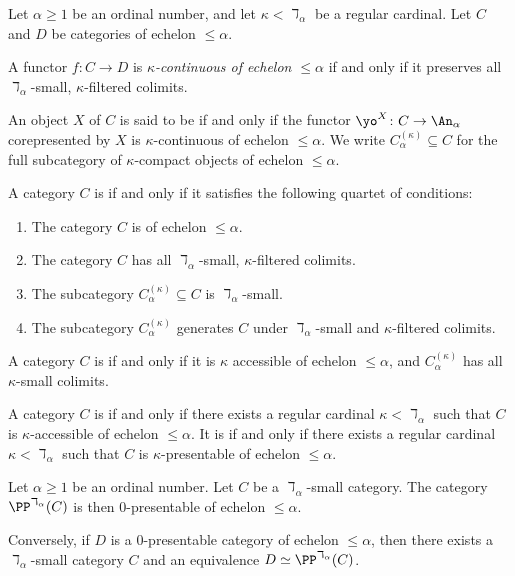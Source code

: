 \begin{definition}
	Let $ \alpha \geq 1 $ be an ordinal number, and
	let $ \kappa < \daleth_{\alpha} $ be a regular cardinal.
	Let $ C $ and $ D $ be categories
	of echelon $ \leq \alpha $.

	A functor $ f \colon C \to D $
	is \emph{$ \kappa $-continuous of echelon  $ \leq \alpha $} if and only if 
	it preserves all $ \daleth_{\alpha} $-small, $ \kappa $-filtered colimits.
	
	An object $ X $ of $ C $
	is said to be  if and only if
	the functor $ \yo^X \colon C \to \An_{\alpha} $ corepresented by $ X $
	is $ \kappa $-continuous of echelon $ \leq \alpha $.
	We write $ C^{(\kappa)}_{\alpha} \subseteq C $
	for the full subcategory of $ \kappa $-compact objects of echelon $ \leq \alpha $.

	A category $C$ is
	 if and only if
	it satisfies the following quartet of conditions:
	\begin{enumerate}
		\item The category $ C $ is of echelon $ \leq \alpha $.
		\item The category $ C $ has all
			$ \daleth_{\alpha} $-small, $ \kappa $-filtered colimits.
		\item The subcategory $ C^{(\kappa)}_{\alpha} \subseteq C $
			is $ \daleth_{\alpha} $-small.
		\item The subcategory $ C^{(\kappa)}_{\alpha} $
			generates $ C $ under $ \daleth_{\alpha} $-small and 
			$ \kappa $-filtered colimits.
	\end{enumerate}
	
	A category $C$ is
	if and only if
	it is $ \kappa $ accessible of echelon $ \leq \alpha $, and  
	$ C^{(\kappa)}_{\alpha} $ has all $ \kappa $-small colimits.

	A category $ C $ is
	if and only if
	there exists a regular cardinal $ \kappa < \daleth_{\alpha} $
	such that $ C $ is $ \kappa $-accessible of echelon $ \leq \alpha $.
	It is
	if and only if
	there exists a regular cardinal $ \kappa < \daleth_{\alpha} $
	such that $ C $ is $ \kappa $-presentable of echelon $ \leq \alpha $.
\end{definition}

\begin{eg}
	Let $ \alpha \geq 1 $ be an ordinal number.
	Let $ C $ be a $ \daleth_{\alpha} $-small category.
	The category $ \PP^{\daleth_{\alpha}}(C) $ is then
	$ 0 $-presentable of echelon $ \leq \alpha $.

	Conversely, if $ D $ is a $ 0 $-presentable category
	of echelon $ \leq \alpha $, then 
	there exists a $ \daleth_{\alpha} $-small category $ C $
	and an equivalence $ D \simeq \PP^{\daleth_{\alpha}}(C) $.
\end{eg}

